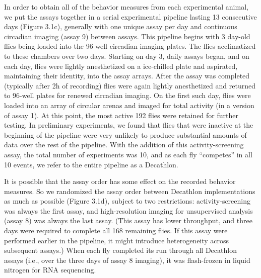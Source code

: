\documentclass[12pt,letterpaper]{article}
\begin{document}
In order to obtain all of the behavior measures from each experimental animal, we put the assays together in a serial experimental pipeline lasting 13 consecutive days (Figure 3.1c), generally with one unique assay per day and continuous circadian imaging (assay 9) between assays. This pipeline begins with 3 day-old flies being loaded into the 96-well circadian imaging plates. The flies acclimatized to these chambers over two days. Starting on day 3, daily assays began, and on each day, flies were lightly anesthetized on a ice-chilled plate and aspirated, maintaining their identity, into the assay arrays. After the assay was completed (typically after 2h of recording) flies were again lightly anesthetized and returned to 96-well plates for renewed circadian imaging. On the first such day, flies were loaded into an array of circular arenas and imaged for total activity (in a version of assay 1). At this point, the most active 192 flies were retained for further testing. In preliminary experiments, we found that flies that were inactive at the beginning of the pipeline were very unlikely to produce substantial amounts of data over the rest of the pipeline. With the addition of this activity-screening assay, the total number of experiments was 10, and as each fly “competes” in all 10 events, we refer to the entire pipeline as a Decathlon. 

It is possible that the assay order has some effect on the recorded behavior measures. So we randomized the assay order between Decathlon implementations as much as possible (Figure 3.1d), subject to two restrictions: activity-screening was always the first assay, and high-resolution imaging for unsupervised analysis (assay 8) was always the last assay. (This assay has lower throughput, and three days were required to complete all 168 remaining flies. If this assay were performed earlier in the pipeline, it might introduce heterogeneity across subsequent assays.) When each fly completed its run through all Decathlon assays (i.e., over the three days of assay 8 imaging), it was flash-frozen in liquid nitrogen for RNA sequencing. 
\end{document}
